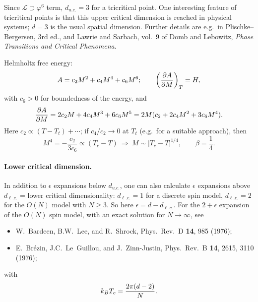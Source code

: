 Since $\mathcal L\supset\varphi^6$ term, $d_{u.c.} = 3$ for a tricritical point. One interesting feature of
tricritical points is that this upper critical dimension is reached in physical systems; $d = 3$ is the usual
spatial dimension. Further details are e.g.\ in Plischke--Bergersen, 3rd ed., and Lawrie and Sarbach, vol.~9 of
Domb and Lebowitz, \emph{Phase Transitions and Critical Phenomena}.

Helmholtz free energy:
\begin{equation}
  A = c_2M^2 + c_4M^4 + c_6M^6;\qquad \left(\frac{\partial A}{\partial M}\right)_T = H,
\end{equation}
with $c_6>0$ for boundedness of the energy, and
\begin{equation}
  \frac{\partial A}{\partial M} = 2c_2M + 4c_4M^3 + 6c_6M^5 = 2M(c_2 + 2c_4M^2 + 3c_6M^4).
\end{equation}
Here $c_2\propto(T-T_t)+\cdots$; if $c_4/c_2\to 0$ at $T_t$ (e.g.\ for a suitable approach), then
\begin{equation}
  M^4 = -\frac{c_2}{3c_6}\propto(T_c-T)\ \Rightarrow\ M\sim|T_c-T|^{1/4},\qquad\beta = \frac{1}{4} .
\end{equation}

\paragraph{Lower critical dimension.}

In addition to $\epsilon$ expansions below $d_{u.c.}$, one can also calculate $\epsilon$ expansions above
$d_{\ell.c.}$ = lower critical dimensionality: $d_{\ell.c.} = 1$ for a discrete spin model, $d_{\ell.c.} = 2$ for
the $O(N)$ model with $N\ge 3$. So here $\epsilon = d-d_{\ell.c.}$. For the $2+\epsilon$ expansion of the $O(N)$
spin model, with an exact solution for $N\to\infty$, see
\begin{itemize}
  \item W.~Bardeen, B.W.~Lee, and R.~Shrock, Phys.\ Rev.\ D \textbf{14}, 985 (1976);
  \item E.~Br\'ezin, J.C.~Le~Guillou, and J.~Zinn-Justin, Phys.\ Rev.\ B \textbf{14}, 2615, 3110 (1976);
\end{itemize}
with
\begin{equation}
  k_{B} T_c = \frac{2\pi(d-2)}{N}.
\end{equation}
